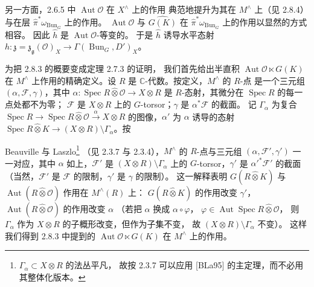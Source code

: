 另一方面，2.6.5 中 $\operatorname{Aut}\mathcal{O}$ 在 $X^\wedge$ 上的作用
典范地提升为其在 $M^\wedge$ 上（见 2.8.4）与在层
$\hat{\pi}^*\omega_{\operatorname{Bun}_G}$ 上的作用。
$\operatorname{Aut}\mathcal{O}$ 与 $\widehat{G(K)}$ 在
$\hat{\pi}^*\omega_{\operatorname{Bun}_G}$ 上的作用以显然的方式相容。
因此 $\hat{h}$ 是 $\operatorname{Aut}\mathcal{O}$-等变的。
于是 $\hat{h}$ 诱导水平态射
$h:\mathfrak{z}=\mathfrak{z}_{\mathfrak{g}}(\mathcal{O})_X\to
\Gamma(\operatorname{Bun}_G,D')_X$。

 为把 2.8.3 的概要变成定理 2.7.3 的证明，
我们首先给出半直积 $\operatorname{Aut}\mathcal{O}\ltimes G(K)$ 在 $M^\wedge$
上作用的精确定义。设 $R$ 是 $\mathbb{C}$-代数。按定义，$M^\wedge$ 的 $R$-点
是一个三元组 $(\alpha,\mathcal{F},\gamma)$，其中
$\alpha:\operatorname{Spec} R\widehat{\otimes}\mathcal{O}\to X\otimes R$
是 $R$-态射，其微分在 $\operatorname{Spec} R$ 的每一点处都不为零；
$\mathcal{F}$ 是 $X\otimes R$ 上的 $G$-torsor；$\gamma$ 是 $\alpha^*\mathcal{F}$ 的截面。
记 $\Gamma_\alpha$ 为复合
$\operatorname{Spec} R\to\operatorname{Spec} R\widehat{\otimes}\mathcal{O}
\xrightarrow{\alpha}X\otimes R$ 的图像，$\alpha'$ 为 $\alpha$ 诱导的态射
$\operatorname{Spec} R\widehat{\otimes}K\to(X\otimes R)\setminus\Gamma_\alpha$。按


Beauville 与 Laszlo\footnote{$\Gamma_\alpha\subset X\otimes R$ 的法丛平凡，
故按 2.3.7 可以应用 [BLa95] 的主定理，而不必用其整体化版本。}
（见 2.3.7 与 2.3.4），$M^\wedge$ 的 $R$-点与三元组 $(\alpha,\mathcal{F}',\gamma')$
一一对应，其中 $\alpha$ 如上，$\mathcal{F}'$ 是 $(X\otimes R)\setminus\Gamma_\alpha$
上的 $G$-torsor，$\gamma'$ 是 $\alpha'^*\mathcal{F}'$ 的截面
（当然，$\mathcal{F}'$ 是 $\mathcal{F}$ 的限制，$\gamma'$ 是 $\gamma$ 的限制）。
这一解释表明 $G(R\widehat{\otimes}K)$ 与
$\operatorname{Aut}(R\widehat{\otimes}\mathcal{O})$ 作用在 $M^\wedge(R)$ 上：
$G(R\widehat{\otimes}K)$ 的作用改变 $\gamma'$，
$\operatorname{Aut}(R\widehat{\otimes}\mathcal{O})$ 的作用改变 $\alpha$
（若把 $\alpha$ 换成 $\alpha\circ\varphi$，
$\varphi\in\operatorname{Aut}\operatorname{Spec} R\widehat{\otimes}\mathcal{O}$，
则 $\Gamma_\alpha$ 作为 $X\otimes R$ 的子概形改变，但作为子集不变，
故 $(X\otimes R)\setminus\Gamma_\alpha$ 不变）。
这样我们得到 2.8.3 中提到的 $\operatorname{Aut}\mathcal{O}\ltimes G(K)$
在 $M^\wedge$ 上的作用。

